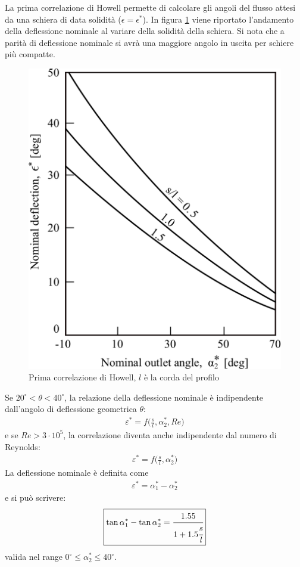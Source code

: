 La prima correlazione di Howell permette di calcolare gli angoli del flusso attesi da una schiera di data solidità ($\epsilon=\epsilon^*$). In figura \ref{fig:1CorrHowell} viene riportato l'andamento della deflessione nominale al variare della solidità della schiera. Si nota che a parità di deflessione nominale si avrà una maggiore angolo in uscita per schiere più compatte.
\begin{figure}
	\centering
	\includegraphics[width=.4\textwidth]{fig/1CorrHowell.pdf}
	\caption{Prima correlazione di Howell, $l$ è la corda del profilo}
	\label{fig:1CorrHowell}
\end{figure}
Se $ 20^{\circ} < \theta < 40^{\circ} $, la relazione della deflessione nominale è indipendente dall'angolo di deflessione geometrica $\theta$:
\begin{align*}
\varepsilon^* = f \bigg( \frac{s}{l}, \alpha_2^*, Re \bigg)
\end{align*}
e se $Re > 3 \cdot 10^5$, la correlazione diventa anche indipendente dal numero di Reynolds:
\begin{align*}
\varepsilon^* = f\bigg(\frac{s}{l}, \alpha_2^*\bigg)
\end{align*}
La deflessione nominale è definita come
\begin{align*}
\varepsilon^* = \alpha_1^* - \alpha_2^*
\end{align*}
e si può scrivere:
\begin{align*}
\boxed{\tan \alpha_1^* - \tan \alpha_2^* = \cfrac{1.55}{1 + 1.5 \cfrac{s}{l}}}
\end{align*}
valida nel range $0^\circ \leq \alpha_2^* \le 40^\circ$.

